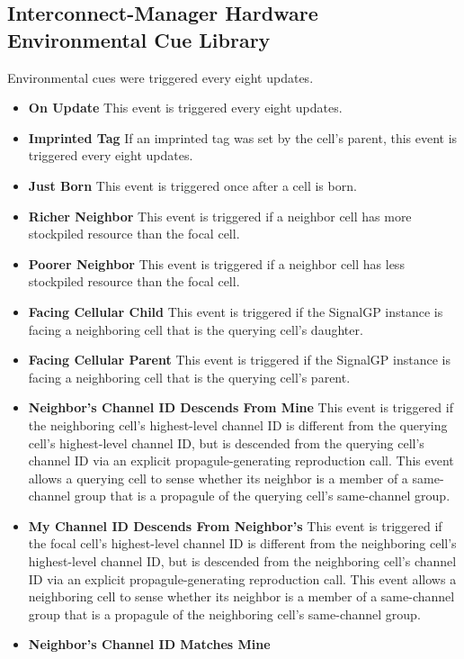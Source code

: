 \subsection{Interconnect-Manager Hardware Environmental Cue Library}

Environmental cues were triggered every eight updates.

\begin{itemize}
\item \textbf{On Update}
This event is triggered every eight updates.
\item \textbf{Imprinted Tag}
If an imprinted tag was set by the cell's parent, this event is triggered every eight updates.
\item \textbf{Just Born}
This event is triggered once after a cell is born.
\item \textbf{Richer Neighbor}
This event is triggered if a neighbor cell has more stockpiled resource than the focal cell.
\item \textbf{Poorer Neighbor}
This event is triggered if a neighbor cell has less stockpiled resource than the focal cell.
\item \textbf{Facing Cellular Child}
This event is triggered if the SignalGP instance is facing a neighboring cell that is the querying cell's daughter.
\item \textbf{Facing Cellular Parent}
This event is triggered if the SignalGP instance is facing a neighboring cell that is the querying cell's parent.
\item \textbf{Neighbor's Channel ID Descends From Mine}
This event is triggered if the neighboring cell's highest-level channel ID is different from the querying cell's highest-level channel ID, but is descended from the querying cell's channel ID via an explicit propagule-generating reproduction call.
This event allows a querying cell to sense whether its neighbor is a member of a same-channel group that is a propagule of the querying cell's same-channel group.
\item \textbf{My Channel ID Descends From Neighbor's}
This event is triggered if the focal cell's highest-level channel ID is different from the neighboring cell's highest-level channel ID, but is descended from the neighboring cell's channel ID via an explicit propagule-generating reproduction call.
This event allows a neighboring cell to sense whether its neighbor is a member of a same-channel group that is a propagule of the neighboring cell's same-channel group.
\item \textbf{Neighbor's Channel ID Matches Mine}

\end{itemize}
